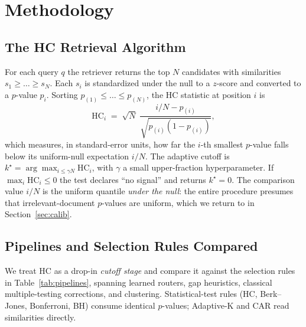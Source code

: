 \documentclass[letterpaper]{article}
\begin{document}
\section{Methodology}

\subsection{The HC Retrieval Algorithm}
\label{sec:hcalg}
For each query $q$ the retriever returns the top $N$ candidates with
similarities $s_1 \ge \dots \ge s_N$. Each $s_i$ is standardized under
the null to a $z$-score and converted to a $p$-value $p_i$. Sorting
$p_{(1)} \le \dots \le p_{(N)}$, the HC statistic at position $i$ is
\[
\mathrm{HC}_i \;=\; \sqrt{N}\;\frac{i/N - p_{(i)}}{\sqrt{p_{(i)}(1-p_{(i)})}},
\]
which measures, in standard-error units, how far the $i$-th smallest
$p$-value falls below its uniform-null expectation $i/N$. The adaptive
cutoff is $k^\star = \arg\max_{i \le \gamma N} \mathrm{HC}_i$, with
$\gamma$ a small upper-fraction hyperparameter. If
$\max_i \mathrm{HC}_i \le 0$ the test declares ``no signal'' and
returns $k^\star = 0$. The comparison value $i/N$ is the uniform
quantile \emph{under the null}: the entire procedure presumes that
irrelevant-document $p$-values are uniform, which we return to in
Section~\ref{sec:calib}.

\subsection{Pipelines and Selection Rules Compared}
We treat HC as a drop-in \emph{cutoff stage} and compare it against the
selection rules in Table~\ref{tab:pipelines}, spanning learned routers,
gap heuristics, classical multiple-testing corrections, and clustering.
Statistical-test rules (HC, Berk--Jones, Bonferroni, BH) consume
identical $p$-values; Adaptive-K and CAR read similarities directly.
\end{document}
